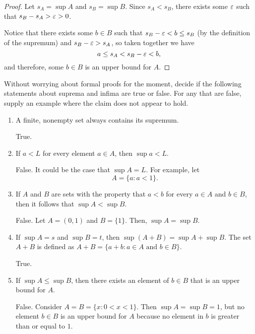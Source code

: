 \begin{proof}
  Let $s_A = \sup A$ and $s_B = \sup B$. Since $s_A < s_B$, there exists some
  $\varepsilon$ such that $s_B - s_A > \varepsilon > 0$. 

  Notice that there exists some $b \in B$ such that $s_B - \varepsilon < b \leq s_B$
  (by the definition of the supremum) and $s_B - \varepsilon > s_A$, so taken together
  we have 
  \[
    a \leq s_A < s_B - \varepsilon < b,
  \]
  and therefore, some $b \in B$ is an upper bound for $A$.
\end{proof}

\begin{problem} \label{prob:sup-inf-claims}
  Without worrying about formal proofs for the moment, decide if the following
  statements about suprema and infima are true or false. For any that are false,
  supply an example where the claim does not appear to hold.

  \begin{enumerate}[label=(\alph*)]
    \item A finite, nonempty set always contains its supremum. \label{prob:finite-set-max-sup}

      True.

    \item If $a < L$ for every element $a \in A$, then $\sup a < L$.

      False. It could be the case that $\sup A = L$. For example, let
      \[
        A = \{ a : a < 1 \}.
      \]

    \item If $A$ and $B$ are sets with the property that $a < b$ for every $a
      \in A$ and $b \in B$, then it follows that $\sup A < \sup B$.

      False. Let $A = (0, 1)$ and $B = \{1\}$. Then, $\sup A = \sup B$.

    \item If $\sup A = s$ and $\sup B = t$, then $\sup (A + B) = \sup A + \sup B$.
      The set $A + B$ is defined as $A + B = \{a + b : a \in A \text{ and } b \in B\}$.

      True. 

    \item If $\sup A \leq \sup B$, then there exists an element of $b \in B$
      that is an upper bound for $A$. 

      False. Consider $A = B = \{ x : 0 < x < 1 \}$. Then $\sup A = \sup B = 1$,
      but no element $b \in B$ is an upper bound for $A$ because no element
      in $b$ is greater than or equal to $1$.

  \end{enumerate}

\end{problem}

